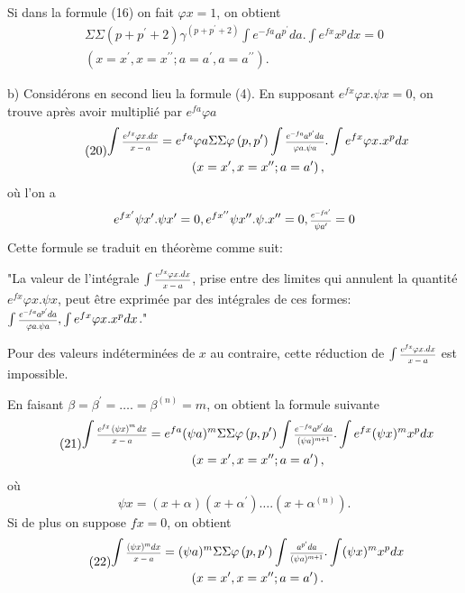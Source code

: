 \documentclass[oneside, 12 pt, leqno]{memoir}
\let\oldfrac\frac
\def\frac#1#2{\mathchoice{\text{\scalebox{.83}{${\oldfrac{#1}{#2}}$}}}{\text{\scalebox{.83}{${\displaystyle\oldfrac{#1}{#2}}$}}}{\genfrac{}{}{}{2}{#1}{#2}}{\genfrac{}{}{}{3}{#1}{#2}}}
\begin{document}
Si dans la formule (16) on fait \(\varphi x=1\), on obtient
\[\tag{19}\begin{gathered}
\Sigma \Sigma\left(p+p^{\prime}+2\right) \gamma^{\left(p+p^{\prime}+2\right)} \int e^{-f a} a^{p^{\prime}} d a. \int e^{f x} x^p d x=0 \\
\left(x=x^{\prime}, x=x^{\prime \prime} ; a=a^{\prime}, a=a^{\prime \prime}\right).
\end{gathered}\]

b) Considérons en second lieu la formule (4). En supposant \(e^{f x} \varphi x. \psi x=0\), on trouve après avoir multiplié par \(e^{f a} \varphi a\)
\[\tag{20}\begin{gathered}
\int \frac{e^{f x} \varphi x. d x}{x-a}=e^{f a} \varphi a \Sigma \Sigma \varphi\left(p, p^{\prime}\right) \int \frac{e^{-f a} a^{p^{\prime}} d a}{\varphi a. \psi a}. \int e^{f x} \varphi x. x^p d x \\
\left(x=x^{\prime}, x=x^{\prime \prime} ; a=a^{\prime}\right),
\end{gathered}\]
où l'on a
\[e^{f x^{\prime}} \psi x^{\prime}. \psi x^{\prime}=0, e^{f x^{\prime \prime}} \psi x^{\prime \prime}. \psi. x^{\prime \prime}=0, \frac{e^{-f a^{\prime}}}{\psi a^{\prime}}=0\]
Cette formule se traduit en théorème comme suit:

"La valeur de l'intégrale \(\int \frac{e^{f x} \varphi x. d x}{x-a}\), prise entre des limites qui annulent la quantité \(e^{f x} \varphi x. \psi x\), peut être exprimée par des intégrales de ces formes: \(\int \frac{e^{-f a} a^{p^{\prime}} d a}{\varphi a. \psi a}, \int e^{f x} \varphi x. x^p d x\)."

Pour des valeurs indéterminées de \(x\) au contraire, cette réduction de \(\int \frac{e^{f x} {\varphi} x. d x}{x-a}\) est impossible.

En faisant \(\beta=\beta^{\prime}=\ldots.=\beta^{(n)}=m\), on obtient la formule suivante
\[\tag{21}\begin{gathered}
\int \frac{e^{f x}\left(\psi x\right)^m d x}{x-a}=e^{f a}(\psi a)^m \Sigma \Sigma \varphi\left(p, p^{\prime}\right) \int \frac{e^{-f a} a^{p^{\prime}} d a}{(\psi a)^{m+1}}. \int e^{f x}(\psi x)^m x^p d x \\
\left(x=x^{\prime}, x=x^{\prime \prime} ; a=a^{\prime}\right),
\end{gathered}\]
où
\[\psi x=(x+\alpha)\left(x+\alpha^{\prime}\right) \ldots. \left(x+\alpha^{(n)}\right).\]
Si de plus on suppose \(f x=0\), on obtient
\[\tag{22}\begin{gathered}
\int \frac{(\psi x)^m d x}{x-a}=(\psi a)^m \Sigma \Sigma \varphi\left(p, p^{\prime}\right) \int \frac{a^{p^{\prime}} d a}{(\psi a)^{m+1}}. \int(\psi x)^m x^p d x \\
\left(x=x^{\prime}, x=x^{\prime \prime};  a=a^{\prime}\right).
\end{gathered}\]
\end{document}

